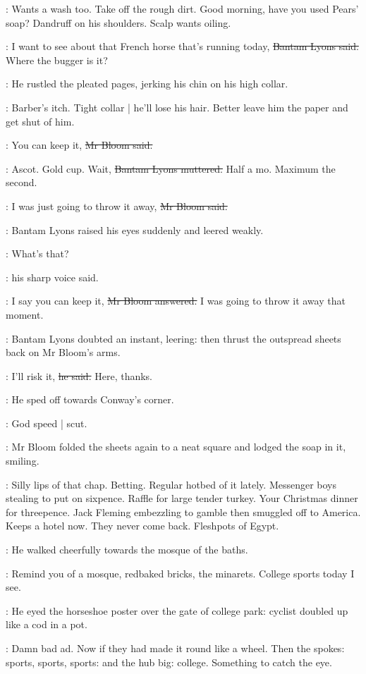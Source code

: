 \BloomInt:
Wants a wash too.
Take off the rough dirt.
Good morning, have you used Pears' soap?
Dandruff on his shoulders.
Scalp wants oiling.

\lyons:
I want to see about that French horse that's running today,
\sout{Bantam Lyons said.}
Where the bugger is it?

:
He rustled the pleated pages,
jerking his chin on his high collar.

\BloomInt:
Barber's itch.
Tight collar | he'll lose his hair.
Better leave him the paper and get shut of him.

\Bloom:
You can keep it,
\sout{Mr Bloom said.}

\lyons:
Ascot.
Gold cup.
Wait,
\sout{Bantam Lyons muttered.}
Half a mo.
Maximum the second.

\Bloom:
I was just going to throw it away,
\sout{Mr Bloom said.}

:
Bantam Lyons raised his eyes suddenly and leered weakly.

\lyons:
What's that?

:
his sharp voice said.

\Bloom:
I say you can keep it,
\sout{Mr Bloom answered.}
I was going to throw it away that moment.

:
Bantam Lyons doubted an instant, leering:
then thrust the outspread sheets back on Mr Bloom's arms.

\lyons:
I'll risk it,
\sout{he said.}
Here, thanks.

:
He sped off towards Conway's corner.

\BloomInt:
God speed | scut.

:
Mr Bloom folded the sheets again to a neat square
and lodged the soap in it,
smiling.

\BloomInt:
Silly lips of that chap.
Betting.
Regular hotbed of it lately.
Messenger boys stealing to put on sixpence.
Raffle for large tender turkey.
Your Christmas dinner for threepence.
Jack Fleming embezzling to gamble
then smuggled off to America.
Keeps a hotel now.
They never come back.
Fleshpots of Egypt.

:
He walked cheerfully towards the mosque of the baths.

\BloomInt:
Remind you of a mosque,
redbaked bricks, the minarets.
College sports today I see.

:
He eyed the horseshoe poster over the gate of college park:
cyclist doubled up like a cod in a pot.

\BloomInt:
Damn bad ad.
Now if they had made it round like a wheel.
Then the spokes:
sports, sports, sports: and the hub big:
college.
Something to catch the eye.

